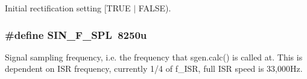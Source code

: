 Initial rectification setting \mbox{[}T\-R\-U\-E $|$ F\-A\-L\-S\-E). \hypertarget{a00032_a8d1689d7437a3410059f1f377ec63ebd}{
\subsubsection[{S\-I\-N\-\_\-\-F\-\_\-\-S\-P\-L}]{\setlength{\rightskip}{0pt plus 5cm}\#define S\-I\-N\-\_\-\-F\-\_\-\-S\-P\-L~8250u}}\label{a00032_a8d1689d7437a3410059f1f377ec63ebd}
Signal sampling frequency, i.\-e. the frequency that sgen.\-calc() is called at. This is dependent on I\-S\-R frequency, currently 1/4 of f\-\_\-\-I\-S\-R, full I\-S\-R speed is 33,000\-Hz. 

